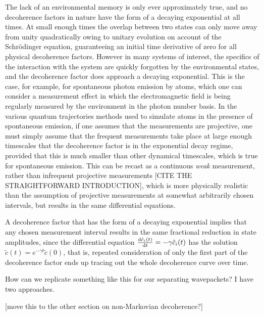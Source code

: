 The lack of an environmental memory is only ever approximately true, and no decoherence factors in nature have the form of a decaying exponential at all times. At small enough times the overlap between two states can only move away from unity quadratically owing to unitary evolution on account of the Schr\"odinger equation, guaranteeing an initial time derivative of zero for all physical decoherence factors. However in many systems of interest, the specifics of the interaction with the system are quickly forgotten by the environmental states, and the decoherence factor does approach a decaying exponential. This is the case, for example, for spontaneous photon emission by atoms, which one can consider a measurement effect in which the electromagnetic field is being regularly measured by the environment in the photon number basis. In the various quantum trajectories methods used to simulate atoms in the presence of spontaneous emission, if one assumes that the measurements are projective, one must simply assume that the frequent measurements take place at large enough timescales that the decoherence factor is in the exponential decay regime, provided that this is much smaller than other dynamical timescales, which is true for spontaneous emission. This can be recast as a continuous \emph{weak} measurement, rather than infrequent projective measurements [CITE THE STRAIGHTFORWARD INTRODUCTION], which is more physically realistic than the assumption of projective measurements at somewhat arbitrarily chosen intervals, but results in the same differential equations.

A decoherence factor that has the form of a decaying exponential implies that any chosen measurement interval results in the same fractional reduction in state amplitudes, since the differential equation $\dv{\tilde c_{i}(t)}{t} = -\gamma \tilde c_i(t)$ has the solution $\tilde c(t) = e^{-\gamma t} \tilde c(0)$, that is, repeated consideration of only the first part of the decoherence factor ends up tracing out the whole decoherence curve over time.

How can we replicate something like this for our separating wavepackets? I have two approaches. 

[move this to the other section on non-Markovian decoherence?]

